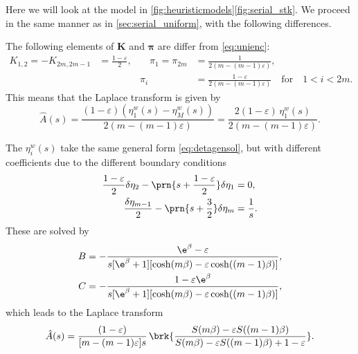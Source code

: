 \documentclass[12pt]{article}
\newcommand{\eqm}{\pi}
\newcommand{\eq}{\boldsymbol{\eqm}}
\newcommand{\etwm}{\eta^w}
\newcommand{\encm}{K}
\newcommand{\enc}{\mathbf{\encm}}
\begin{document}
Here we will look at the model in \cref{fig:heuristicmodels}\ref{fig:serial_stk}.
We proceed in the same manner as in \cref{sec:serial_uniform}, with the following differences.

The following elements of \(\enc\) and \(\eq\) are differ from \eqref{eq:unienc}:
%
\begin{equation}\label{eq:stickyenc}
  \begin{aligned}
  \encm_{1,2} = -\encm_{2m,2m-1} &= \frac{1-\varepsilon}{2},
  &\quad
  \eqm_1 = \eqm_{2m} &= \frac{1}{2(m-(m-1)\varepsilon)},
  \\ &&
  \eqm_i &=  \frac{1-\varepsilon}{2(m-(m-1)\varepsilon)}
  \quad\text{for}\quad 1<i<2m.
  \end{aligned}
\end{equation}
%
This means that the Laplace transform is given by
%
\begin{equation}\label{eq:stickyareaeta}
  \hat{A}(s) = \frac{(1-\varepsilon)(\etwm_1(s)-\etwm_M(s))}
                    {2(m-(m-1)\varepsilon)}
       = \frac{2(1-\varepsilon)\, \etwm_1(s)}{2(m-(m-1)\varepsilon)}.
\end{equation}
%

The \(\etwm_i(s)\) take the same general form \eqref{eq:detagensol}, but with different coefficients due to the different boundary conditions
%
\begin{equation}\label{eq:detabndsticky}
\begin{aligned}
  \frac{1 - \varepsilon}{2} \delta \eta_2 
    - \prn{s+\frac{1-\varepsilon}{2}} \delta \eta_1 
    &= 0, \\
  \frac{\delta \eta_{m-1}}{2} 
    - \prn{s+\frac{3}{2}} \delta \eta_{m} 
    &= \frac{1}{s}.
\end{aligned}
\end{equation}
%
These are solved by
%
\begin{equation}\label{eq:stickycoeffs}
\begin{aligned}
  B &= -\frac{\e^{\beta} - \varepsilon}
      {s [\e^{\beta} + 1] [\cosh(m\beta) - \varepsilon \cosh((m-1)\beta)]}, \\
  C &= -\frac{1 - \varepsilon\e^{\beta}}
      {s [\e^{\beta} + 1] [\cosh(m\beta) - \varepsilon \cosh((m-1)\beta)]},
\end{aligned}
\end{equation}
%
which leads to the Laplace transform
%
\begin{equation}\label{eq:stickylaplace}
  \hat{A}(s) = \frac{(1-\varepsilon)}{[m-(m-1)\varepsilon]s} \,
      \brk{\frac{S(m\beta) - \varepsilon S((m-1)\beta)}
      {S(m\beta) - \varepsilon S((m-1)\beta) + 1 - \varepsilon}}.
\end{equation}
%
\end{document}
